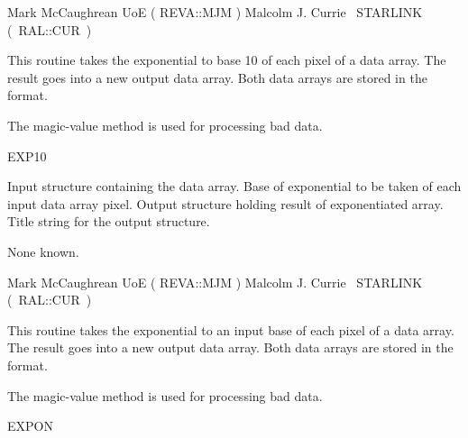 {\begin{manroutinedescription}
  Mark McCaughrean UoE ( {\mantt REVA}::{\mantt MJM} )
  Malcolm J. Currie ~STARLINK \mbox{( {\mantt RAL}::{\mantt CUR} )}
\end{manroutinedescription}

\begin{manroutinedescription}
  This routine takes the exponential to base 10 of each pixel of
  a data array. The result goes into a new output data array.
  Both data arrays are stored in the {} format.

  The magic-value method is used for processing bad data.

  EXP10

\begin{manparametertable}
  Input {} structure containing the data array.
  Base of exponential to be taken of each input data array pixel. \mbox{\mantt [10]}
  Output {} structure holding result of exponentiated array.
  Title string for the output {} structure. \mbox{}
\end{manparametertable}
  None known.

  Mark McCaughrean UoE ( {\mantt REVA}::{\mantt MJM} )
  Malcolm J. Currie ~STARLINK \mbox{( {\mantt RAL}::{\mantt CUR} )}
\end{manroutinedescription}

\begin{manroutinedescription}
  This routine takes the exponential to an input base of each pixel
  of a data array. The result goes into a new output data array.
  Both data arrays are stored in the {} format.

  The magic-value method is used for processing bad data.

  EXPON


\end{manroutinedescription}}
